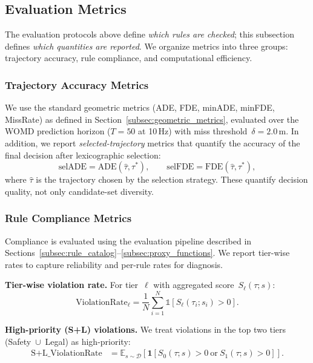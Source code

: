 \subsection{Evaluation Metrics}
\label{subsec:metrics}

The evaluation protocols above define \emph{which rules are checked}; this subsection defines \emph{which quantities are reported}.  We organize metrics into three groups: trajectory accuracy, rule compliance, and computational efficiency.

\subsubsection{Trajectory Accuracy Metrics}

We use the standard geometric metrics (ADE, FDE, minADE, minFDE, MissRate) as defined in Section~\ref{subsec:geometric_metrics}, evaluated over the WOMD prediction horizon ($T{=}50$ at 10\,Hz) with miss threshold~$\delta = 2.0\,\text{m}$.  In addition, we report \emph{selected-trajectory} metrics that quantify the accuracy of the final decision after lexicographic selection:
\begin{equation}
\text{selADE} = \text{ADE}(\hat{\tau}, \tau^*), \qquad
\text{selFDE} = \text{FDE}(\hat{\tau}, \tau^*),
\end{equation}
where $\hat{\tau}$ is the trajectory chosen by the selection strategy.  These quantify decision quality, not only candidate-set diversity. 
\subsubsection{Rule Compliance Metrics}

Compliance is evaluated using the evaluation pipeline described in Sections~\ref{subsec:rule_catalog}--\ref{subsec:proxy_functions}.  We report tier-wise rates to capture reliability and per-rule rates for diagnosis.

\textbf{Tier-wise violation rate.}
For tier~$\ell$ with aggregated score~$S_\ell(\tau; s)$:
\begin{equation}
\text{ViolationRate}_\ell
= \frac{1}{N} \sum_{i=1}^{N} \mathbb{1}\!\left[S_\ell(\tau_i; s_i) > 0\right].
\end{equation}

\textbf{High-priority (S+L) violations.}
We treat violations in the top two tiers (Safety~$\cup$~Legal) as high-priority:
\begin{align}
\text{S{+}L\_ViolationRate}
&=\mathbb{E}_{s \sim \mathcal{D}} \left[
\mathbf{1}\!\left[S_0(\tau; s) > 0 \ \text{or}\ S_1(\tau; s) > 0\right]
\right].\nonumber
\end{align}


